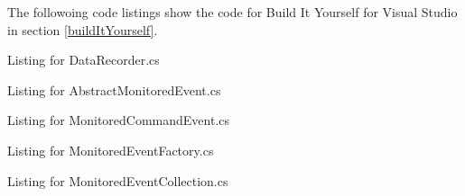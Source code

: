 The followoing code listings show the code for Build It Yourself for Visual Studio in section \ref{buildItYourself}.

Listing for DataRecorder.cs


\newpage
Listing for AbstractMonitoredEvent.cs


\newpage
Listing for MonitoredCommandEvent.cs


\newpage
Listing for MonitoredEventFactory.cs


\newpage
Listing for MonitoredEventCollection.cs


